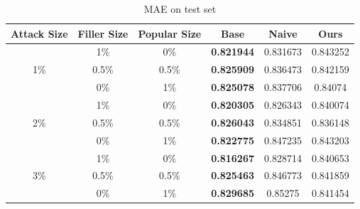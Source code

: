 \documentclass[master,english,final]{kaist-ucs}
\begin{document}
\begin{table}[h]
\caption{MAE on test set}
\label{resultMAE}
\begin{center}
\begin{tabular}{|c|c|c|c|c|c|}
\hline
\textbf{Attack Size} & \textbf{Filler Size} & \textbf{Popular Size} & \textbf{Base} & \textbf{Naive} & \textbf{Ours}     \\ \hline
\multirow{3}{*}{1\%} & 1\%                  & 0\%                   & \textbf{0.821944}      & 0.831673       & 0.843252 \\ \cline{2-6}
                     & 0.5\%               & 0.5\%                & \textbf{0.825909}      & 0.836473       & 0.842159 \\ \cline{2-6}
                     & 0\%                  & 1\%                   & \textbf{0.825078}      & 0.837706       & 0.84074  \\ \hline
\multirow{3}{*}{2\%} & 1\%                  & 0\%                   & \textbf{0.820305}      & 0.826343       & 0.840074 \\ \cline{2-6}
                     & 0.5\%               & 0.5\%                & \textbf{0.826043}      & 0.834851       & 0.836148 \\ \cline{2-6}
                     & 0\%                  & 1\%                   & \textbf{0.822775}      & 0.847235       & 0.843203 \\ \hline
\multirow{3}{*}{3\%} & 1\%                  & 0\%                   & \textbf{0.816267}      & 0.828714       & 0.840653 \\ \cline{2-6}
                     & 0.5\%               & 0.5\%                & \textbf{0.825463}      & 0.846773       & 0.841859 \\ \cline{2-6}
                     & 0\%                  & 1\%                   & \textbf{0.829685}      & 0.85275        & 0.841454 \\ \hline
\end{tabular}
\end{center}
\end{table}
\end{document}

